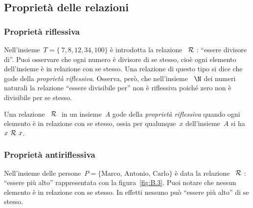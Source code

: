 \subsection{Proprietà delle relazioni}
\label{subsec:rel_proprieta}

\subsubsection{Proprietà riflessiva}

 \begin{esempio}

Nell'insieme~\(T = \lbrace~7, 8, 12, 34, 100 \rbrace\) è introdotta la 
relazione~\(~\mathcal{R}~\): ``essere divisore di''.
Puoi osservare che ogni numero è divisore di se stesso, cioè ogni elemento 
dell'insieme è in relazione
con se stesso. Una relazione di questo tipo si dice che gode della 
\emph{proprietà riflessiva}.
Osserva, però, che nell'insieme ~\(\N\) dei numeri naturali la relazione 
``essere divisibile per'' non è riflessiva poiché zero non è divisibile per 
se 
stesso.
 \end{esempio}

\begin{definizione}
Una relazione~\(~\mathcal{R}~\) in un insieme~\(A\) gode della \emph{proprietà 
riflessiva} 
quando ogni elemento è in relazione con se stesso, ossia per qualunque~\(x\)
dell'insieme~\(A\) si ha~\(x ~\mathcal{R}~ x\).
\end{definizione}


\subsubsection{Proprietà antiriflessiva}

 \begin{esempio}
Nell'insieme delle persone~\(P = \lbrace\text{Marco, Antonio, Carlo}\rbrace\) 
è 
data la relazione~\(~\mathcal{R}~\): ``essere più alto''
rappresentata con la figura~\ref{fig:B.3}.
Puoi notare che nessun elemento è in relazione con se stesso. In effetti 
nessuno 
può ``essere più alto'' di se stesso.

 \end{esempio}

